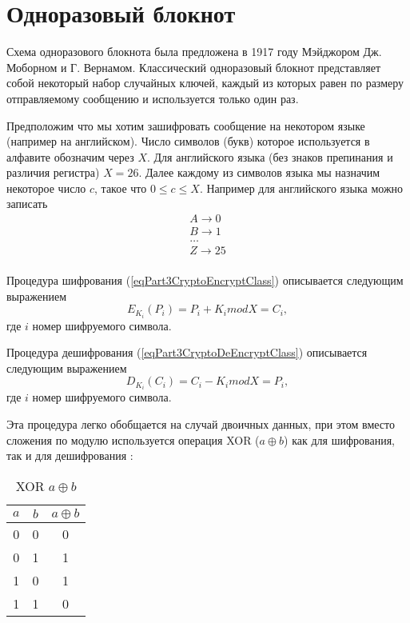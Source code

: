 \section{Одноразовый блокнот}
Схема одноразового блокнота была предложена в 1917 году Мэйджором
Дж. Моборном и Г. Вернамом. Классический одноразовый блокнот представляет собой
некоторый набор случайных ключей, каждый из которых равен по размеру
отправляемому сообщению и используется только один раз. 

Предположим что мы хотим зашифровать сообщение на некотором языке
(например на английском). Число символов (букв) которое используется в
алфавите обозначим через $X$. Для английского языка (без знаков
препинания и различия регистра) $X = 26$. Далее каждому из символов
языка мы назначим некоторое число $c$, такое что $0 \le c \le
X$. Например для английского языка можно записать
\begin{equation}
\begin{array}{c}
A \rightarrow 0 \\
B \rightarrow 1 \\
\dots \\
Z \rightarrow 25 \\
\end{array}
\nonumber
\end{equation}
  
Процедура шифрования (\ref{eqPart3CryptoEncryptClass}) описывается
следующим выражением
\begin{equation}
E_{K_i}\left(P_i\right) = P_i + K_i mod X = C_i,
\label{eqPart3CryptoEncryptVernam}
\end{equation}
где $i$ номер шифруемого символа.

Процедура дешифрования (\ref{eqPart3CryptoDeEncryptClass}) описывается
следующим выражением
\begin{equation}
D_{K_i}\left(C_i\right) = C_i - K_i mod X = P_i,
\label{eqPart3CryptoDeEncryptVernam}
\end{equation}
где $i$ номер шифруемого символа.

Эта процедура легко обобщается на случай двоичных данных, при этом
вместо сложения по модулю используется операция XOR ($a \oplus b$) как
для шифрования, так и для дешифрования :
\begin{table}
\centering
\begin{tabular}{|c|c|c|}
\hline
$a$ & $b$ & $a \oplus b$ \\ \hline
0  & 0 & 0 \\
0  & 1 & 1 \\
1  & 0 & 1 \\
1  & 1 & 0 \\ \hline
\end{tabular}
\caption{XOR $a \oplus b$}
\label{tblXOR}
\end{table}


